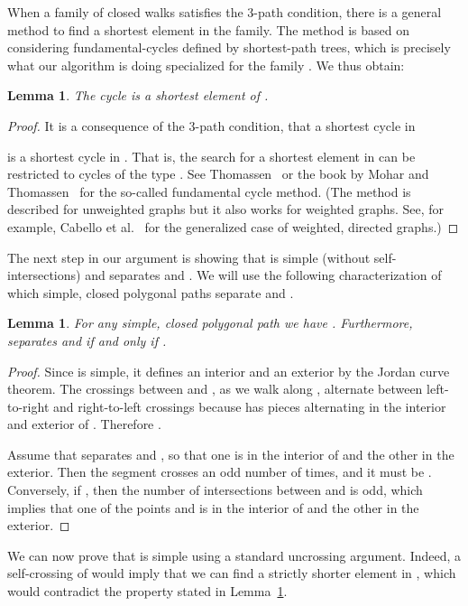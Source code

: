 \documentclass[11pt,a4paper]{article}
\newtheorem{lemma}[definition]{Lemma}
\begin{document}
When a family of closed walks satisfies the 3-path condition, there is a general method to find a shortest element in the family.
The method is based on considering fundamental-cycles defined by shortest-path trees, which is
precisely what our algorithm is doing specialized for the family . 
We thus obtain:

\begin{lemma}\label{le:shortest}
	The cycle  is a shortest element of .
\end{lemma}
\begin{proof}
It is a consequence of the 3-path condition, 
	that a shortest cycle in 
	
	is a shortest cycle in . That is, the search for a shortest element in 
	can be restricted to cycles of the type .
	See Thomassen~\cite{t-egsnc-90} or the book by Mohar and Thomassen~\cite[Chapter 4]{mt-gs-01} 
	for the so-called fundamental cycle method. 
	(The method is described for unweighted graphs but it also works for weighted graphs.
	See, for example, Cabello et al.~\cite{ccl-fsntc-10} for the generalized case of weighted, directed graphs.)
\end{proof}

The next step in our argument is showing that  is simple (without self-intersections) 
and separates  and .
We will use the following characterization of which simple, closed  
polygonal paths separate  and . 

\begin{lemma}\label{le:jordan}
	For any simple, closed polygonal path  we have .
	Furthermore,  separates  and  if and only if .
\end{lemma}
\begin{proof} 
	Since  is simple, it defines an interior and an exterior by the Jordan curve theorem.
	The crossings between  and , as we walk along ,
	alternate between left-to-right and right-to-left crossings because  has
	pieces alternating in the interior and exterior of .
	Therefore .
	
	Assume that  separates  and , so that one is in the interior of 
	and the other in the exterior.
	Then the segment  crosses  an odd number of times, and it must be 
	. Conversely, if , then the number of intersections between
	 and  is odd, which implies that one of the points  and  is in the interior
	of  and the other in the exterior.
\end{proof}

We can now prove that  is simple using a standard uncrossing argument.
Indeed, a self-crossing of  would imply that we can find a strictly 
shorter element in , which would contradict the property stated in Lemma~\ref{le:shortest}.
\end{document}
